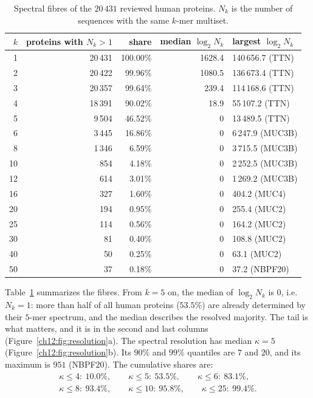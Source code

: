 \begin{table}[t]
\centering\small
\begin{tabular}{rrrrl}
\toprule
$k$ & proteins with $N_k>1$ & share & median $\log_2N_k$ & largest $\log_2N_k$\\
\midrule
1 & 20\,431 & 100.00\% & 1628.4 & 140\,656.7 (TTN)\\
2 & 20\,422 & 99.96\% & 1080.5 & 136\,673.4 (TTN)\\
3 & 20\,357 & 99.64\% & 239.4 & 114\,168.6 (TTN)\\
4 & 18\,391 & 90.02\% & 18.9 & 55\,107.2 (TTN)\\
5 & 9\,504 & 46.52\% & 0 & 13\,489.5 (TTN)\\
6 & 3\,445 & 16.86\% & 0 & 6\,247.9 (MUC3B)\\
8 & 1\,346 & 6.59\% & 0 & 3\,715.5 (MUC3B)\\
10 & 854 & 4.18\% & 0 & 2\,252.5 (MUC3B)\\
12 & 614 & 3.01\% & 0 & 1\,269.2 (MUC3B)\\
16 & 327 & 1.60\% & 0 & 404.2 (MUC4)\\
20 & 194 & 0.95\% & 0 & 255.4 (MUC2)\\
25 & 114 & 0.56\% & 0 & 164.2 (MUC2)\\
30 & 81 & 0.40\% & 0 & 108.8 (MUC2)\\
40 & 50 & 0.25\% & 0 & 63.1 (MUC2)\\
50 & 37 & 0.18\% & 0 & 37.2 (NBPF20)\\
\bottomrule
\end{tabular}
\caption{Spectral fibres of the $20\,431$ reviewed human proteins. $N_k$ is the number of sequences
with the same $k$-mer multiset.}\label{ch12:tab:fibres}
\end{table}

Table~\ref{ch12:tab:fibres} summarizes the fibres. From $k=5$ on, the median of $\log_2N_k$ is $0$, i.e.\
$N_k=1$: more than half of all human proteins ($53.5\%$) are already determined by their $5$-mer
spectrum, and the median describes the resolved majority. The tail is what matters, and it is in the
second and last columns (Figure~\ref{ch12:fig:resolution}a). The spectral resolution has median $\kappa=5$
(Figure~\ref{ch12:fig:resolution}b). Its
$90\%$ and $99\%$ quantiles are $7$ and $20$, and its maximum is $951$ (NBPF20). The cumulative shares
are:
\begin{gather*}
\kappa\le4:\ 10.0\%,\qquad \kappa\le5:\ 53.5\%,\qquad \kappa\le6:\ 83.1\%,\\
\kappa\le8:\ 93.4\%,\qquad \kappa\le10:\ 95.8\%,\qquad \kappa\le25:\ 99.4\%.
\end{gather*}

